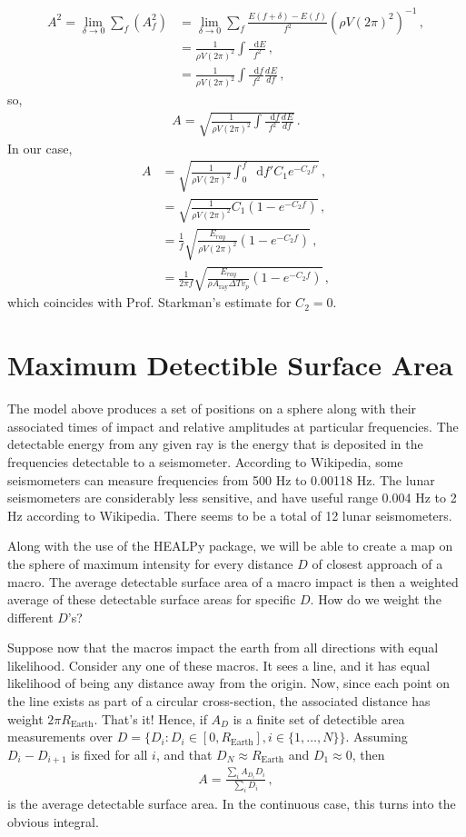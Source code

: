 \documentclass{article}
\newcommand*\diff{\mathop{}\!\mathrm{d}}
\newcommand*\te[1]{\text{#1}}
\newcommand*\p[1]{\left(#1\right)}
\newcommand*\f[2]{\frac{#1}{#2}}
\newcommand*\td[3]{\frac{d^{#3}#1}{d #2^{#3}}}
\begin{document}
\begin{align}
A^2 = \lim_{\delta\to 0}\sum_f (A_f^2) &= \lim_{\delta\to 0}\sum_f \f{E(f+\delta)-E(f)}{f^2}\p{\rho V  (2\pi)^2}^{-1}\,,\\
&=\f{1}{\rho V  (2\pi)^2} \int \f{\diff E}{f^2}\,,\\
&=\f{1}{\rho V  (2\pi)^2} \int \f{\diff f}{f^2}\td{E}{f}{}\,,
\end{align}
so,
\begin{align}
A = \sqrt{\f{1}{\rho V  (2\pi)^2} \int \f{\diff f}{f^2}\td{E}{f}{}}\,.
\end{align}
In our case,
\begin{align}
A &= \sqrt{\f{1}{\rho V  (2\pi)^2} \int_0^f \diff f' C_1 e^{-C_2 f'}}\,,\\
&= \sqrt{\f{1}{\rho V  (2\pi)^2}C_1(1- e^{-C_2 f})}\,,\\
&= \f{1}{f}\sqrt{\f{E_{ray}}{\rho V  (2\pi)^2}(1- e^{-C_2 f})}\,,\\
&= \f{1}{2\pi f}\sqrt{\f{E_{ray}}{\rho A_{\te{ray}}\Delta T v_p}(1- e^{-C_2 f})}\,,
\end{align}
which coincides with Prof. Starkman's estimate for $C_2 = 0$.
\pagebreak
\section{Maximum Detectible Surface Area}
\indent

The model above produces a set of positions on a sphere along with their associated times of impact and relative amplitudes at particular frequencies. The detectable energy from any given ray is the energy that is deposited in the frequencies detectable to a seismometer. According to Wikipedia, some seismometers can measure frequencies from 500 Hz to 0.00118 Hz. The lunar seismometers are considerably less sensitive, and have useful range 0.004 Hz to 2 Hz according to Wikipedia. There seems to be a total of 12 lunar seismometers.

Along with the use of the HEALPy package, we will be able to create a map on the sphere of maximum intensity for every distance $D$ of closest approach of a macro. The average detectable surface area of a macro impact is then a weighted average of these detectable surface areas for specific $D$. How do we weight the different $D$'s?

Suppose now that the macros impact the earth from all directions with equal likelihood. Consider any one of these macros. It sees a line, and it has equal likelihood of being any distance away from the origin. Now, since each point on the line exists as part of a circular cross-section, the associated distance has weight $2\pi R_{\te{Earth}}$. That's it! Hence, if $A_D$ is a finite set of detectible area measurements over $D = \{D_i:D_i\in[0,R_\te{Earth}],i\in\{1,\dots,N\}\}$. Assuming $D_i - D_{i+1}$ is fixed for all $i$, and that $D_N\approx R_{\te{Earth}}$ and $D_1 \approx 0$, then 
\begin{align}
A=\f{\sum_i A_{D_i}D_i}{\sum_i D_i}\,,
\end{align}
is the average detectable surface area. In the continuous case, this turns into the obvious integral.
\end{document}

